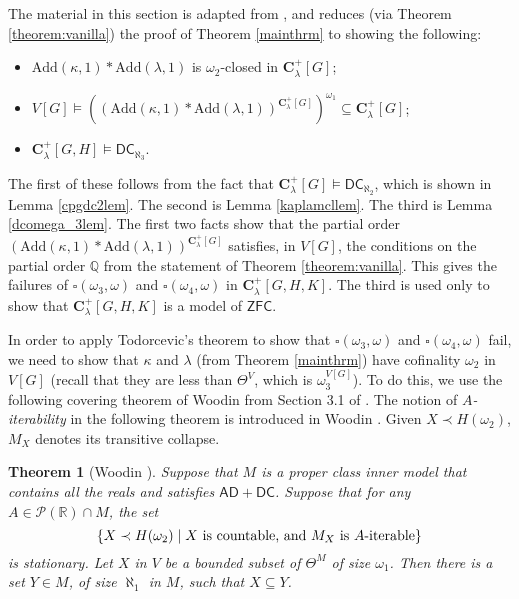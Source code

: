 \documentclass[12pt]{article}
\newtheorem{theorem}{Theorem}[section]
\def\c{{\mathbf{C}}}
\newcommand{\ZFC}{\mathsf{ZFC}}
\renewcommand{\models}{\vDash}
\newcommand{\AD}{\mathsf{AD}}
\newcommand{\Add}{\mathrm{Add}}
\newcommand{\bbQ}{\mathbb{Q}}
\newcommand{\bbR}{\mathbb{R}}
\newcommand{\DC}{\mathsf{DC}}
\newcommand{\MM}{\mathsf{MM}}
\begin{document}
The material in this section is adapted from \cite{SquarePaper}, and reduces (via Theorem \ref{theorem:vanilla}) the proof of Theorem \ref{mainthrm} to showing the following:
\begin{itemize}
  \item $\Add(\kappa, 1)*\Add(\lambda, 1)$ is $\omega_{2}$-closed in $\c^{+}_{\lambda}[G]$;
  \item $V[G] \models ((\Add(\kappa, 1)*\Add(\lambda, 1))^{\c^{+}_{\lambda}[G]})^{\omega_{1}} \subseteq \c^{+}_{\lambda}[G]$;
  \item $\c^{+}_{\lambda}[G, H] \models \DC_{\aleph_{3}}$.
\end{itemize}
The first of these follows from the fact that $\c^{+}_{\lambda}[G] \models \DC_{\aleph_{2}}$, which is shown in Lemma \ref{cpgdc2lem}.
The second is Lemma \ref{kaplamcllem}.
The third is Lemma \ref{dcomega_3lem}.
The first two facts show that the partial order $(\Add(\kappa, 1)*\Add(\lambda, 1))^{\c^{+}_{\lambda}[G]}$ satisfies, in $V[G]$, the conditions on the partial order $\bbQ$ from the statement of Theorem \ref{theorem:vanilla}.
This gives the failures of $\square(\omega_{3}, \omega)$ and $\square(\omega_{4}, \omega)$ in $\c^{+}_{\lambda}[G,H,K]$. The third
is used only to show that $\c^{+}_{\lambda}[G,H,K]$ is a model of $\ZFC$.




In order to apply Todorcevic's theorem to show that $\square(\omega_{3}, \omega)$ and $\square(\omega_{4}, \omega)$ fail, we need to show that $\kappa$ and $\lambda$ (from Theorem \ref{mainthrm}) have cofinality $\omega_{2}$ in
$V[G]$ (recall that they are less than $\Theta^{V}$, which is $\omega_{3}^{V[G]}$). To do this, we use the following covering theorem of Woodin from Section 3.1 of \cite{Woodin}.
The notion of {\em $A$-iterability} in the following theorem is introduced in
Woodin \cite[Definition 3.30]{Woodin}. Given $X\prec H(\omega_2)$, $M_X$ denotes its transitive
collapse.

\begin{theorem}[Woodin {\cite[Theorem 3.45]{Woodin}}] \label{thm:woodin}
Suppose that $M$ is a proper class inner model that contains all the reals and satisfies $\AD+\DC$.
Suppose that for any $A\in{\mathcal P}(\bbR)\cap M$, the set
$$ \{X\prec H(\omega_2)\mid \mbox{\rm$X$ is countable, and $M_X$ is $A$-iterable}\} $$
is stationary. Let $X$ in $V$ be a bounded subset of $\Theta^M$ of size $\omega_1$. Then there is a set
$Y\in M$, of size $\aleph_1$ in $M$, such that $X\subseteq Y$.
\end{theorem}
\end{document}
